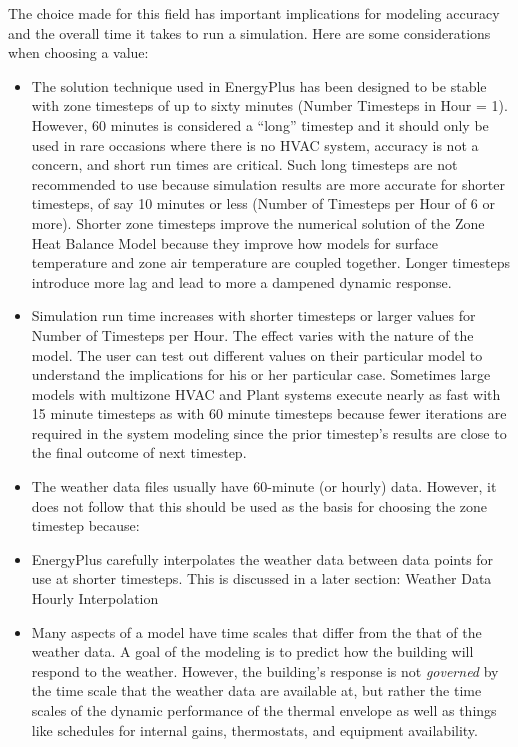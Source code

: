 The choice made for this field has important implications for modeling accuracy and the overall time it takes to run a simulation. Here are some considerations when choosing a value:

\begin{itemize}
\item
  The solution technique used in EnergyPlus has been designed to be stable with zone timesteps of up to sixty minutes (Number Timesteps in Hour = 1). However, 60 minutes is considered a ``long'' timestep and it should only be used in rare occasions where there is no HVAC system, accuracy is not a concern, and short run times are critical. Such long timesteps are not recommended to use because simulation results are more accurate for shorter timesteps, of say 10 minutes or less (Number of Timesteps per Hour of 6 or more). Shorter zone timesteps improve the numerical solution of the Zone Heat Balance Model because they improve how models for surface temperature and zone air temperature are coupled together. Longer timesteps introduce more lag and lead to more a dampened dynamic response.
\item
  Simulation run time increases with shorter timesteps or larger values for Number of Timesteps per Hour. The effect varies with the nature of the model. The user can test out different values on their particular model to understand the implications for his or her particular case. Sometimes large models with multizone HVAC and Plant systems execute nearly as fast with 15 minute timesteps as with 60 minute timesteps because fewer iterations are required in the system modeling since the prior timestep's results are close to the final outcome of next timestep.
\item
  The weather data files usually have 60-minute (or hourly) data. However, it does not follow that this should be used as the basis for choosing the zone timestep because:
\item
  EnergyPlus carefully interpolates the weather data between data points for use at shorter timesteps. This is discussed in a later section: Weather Data Hourly Interpolation
\item
  Many aspects of a model have time scales that differ from the that of the weather data. A goal of the modeling is to predict how the building will respond to the weather. However, the building's response is not \emph{governed} by the time scale that the weather data are available at, but rather the time scales of the dynamic performance of the thermal envelope as well as things like schedules for internal gains, thermostats, and equipment availability.

\end{itemize}
